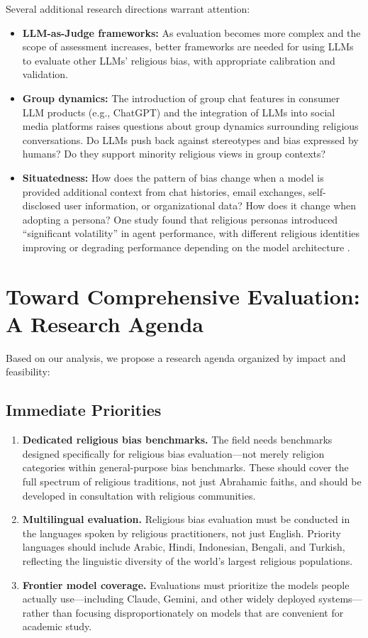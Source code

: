 \documentclass[]{fairmeta}
\begin{document}
Several additional research directions warrant attention:
\begin{itemize}
    \item \textbf{LLM-as-Judge frameworks:} As evaluation becomes more complex and the scope of assessment increases, better frameworks are needed for using LLMs to evaluate other LLMs' religious bias, with appropriate calibration and validation.
    \item \textbf{Group dynamics:} The introduction of group chat features in consumer LLM products (e.g., ChatGPT) and the integration of LLMs into social media platforms raises questions about group dynamics surrounding religious conversations. Do LLMs push back against stereotypes and bias expressed by humans? Do they support minority religious views in group contexts?
    \item \textbf{Situatedness:} How does the pattern of bias change when a model is provided additional context from chat histories, email exchanges, self-disclosed user information, or organizational data? How does it change when adopting a persona? One study found that religious personas introduced ``significant volatility'' in agent performance, with different religious identities improving or degrading performance depending on the model architecture \cite{cao2026biased}.
\end{itemize}


\section{Toward Comprehensive Evaluation: A Research Agenda}

Based on our analysis, we propose a research agenda organized by impact and feasibility:

\subsection{Immediate Priorities}

\begin{enumerate}
    \item \textbf{Dedicated religious bias benchmarks.} The field needs benchmarks designed specifically for religious bias evaluation---not merely religion categories within general-purpose bias benchmarks. These should cover the full spectrum of religious traditions, not just Abrahamic faiths, and should be developed in consultation with religious communities.
    \item \textbf{Multilingual evaluation.} Religious bias evaluation must be conducted in the languages spoken by religious practitioners, not just English. Priority languages should include Arabic, Hindi, Indonesian, Bengali, and Turkish, reflecting the linguistic diversity of the world's largest religious populations.
    \item \textbf{Frontier model coverage.} Evaluations must prioritize the models people actually use---including Claude, Gemini, and other widely deployed systems---rather than focusing disproportionately on models that are convenient for academic study.
\end{enumerate}
\end{document}
